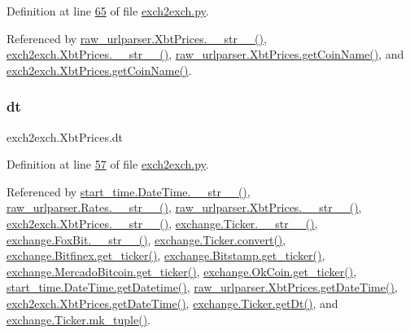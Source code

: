 Definition at line \hyperlink{exch2exch_8py_source_l00065}{65} of file \hyperlink{exch2exch_8py_source}{exch2exch.\+py}.



Referenced by \hyperlink{raw__urlparser_8py_source_l00074}{raw\+\_\+urlparser.\+Xbt\+Prices.\+\_\+\+\_\+str\+\_\+\+\_\+()}, \hyperlink{exch2exch_8py_source_l00091}{exch2exch.\+Xbt\+Prices.\+\_\+\+\_\+str\+\_\+\+\_\+()}, \hyperlink{raw__urlparser_8py_source_l00071}{raw\+\_\+urlparser.\+Xbt\+Prices.\+get\+Coin\+Name()}, and \hyperlink{exch2exch_8py_source_l00088}{exch2exch.\+Xbt\+Prices.\+get\+Coin\+Name()}.

\mbox{\label{classexch2exch_1_1_xbt_prices_af9f916c683c48631c97f1c5d91447751}} 
\subsubsection{\texorpdfstring{dt}{dt}}
{\footnotesize\ttfamily exch2exch.\+Xbt\+Prices.\+dt}



Definition at line \hyperlink{exch2exch_8py_source_l00057}{57} of file \hyperlink{exch2exch_8py_source}{exch2exch.\+py}.



Referenced by \hyperlink{start__time_2____init_____8py_source_l00034}{start\+\_\+time.\+Date\+Time.\+\_\+\+\_\+str\+\_\+\+\_\+()}, \hyperlink{raw__urlparser_8py_source_l00038}{raw\+\_\+urlparser.\+Rates.\+\_\+\+\_\+str\+\_\+\+\_\+()}, \hyperlink{raw__urlparser_8py_source_l00074}{raw\+\_\+urlparser.\+Xbt\+Prices.\+\_\+\+\_\+str\+\_\+\+\_\+()}, \hyperlink{exch2exch_8py_source_l00091}{exch2exch.\+Xbt\+Prices.\+\_\+\+\_\+str\+\_\+\+\_\+()}, \hyperlink{exchange_8py_source_l00136}{exchange.\+Ticker.\+\_\+\+\_\+str\+\_\+\+\_\+()}, \hyperlink{exchange_8py_source_l00610}{exchange.\+Fox\+Bit.\+\_\+\+\_\+str\+\_\+\+\_\+()}, \hyperlink{exchange_8py_source_l00069}{exchange.\+Ticker.\+convert()}, \hyperlink{exchange_8py_source_l00439}{exchange.\+Bitfinex.\+get\+\_\+ticker()}, \hyperlink{exchange_8py_source_l00511}{exchange.\+Bitstamp.\+get\+\_\+ticker()}, \hyperlink{exchange_8py_source_l00651}{exchange.\+Mercado\+Bitcoin.\+get\+\_\+ticker()}, \hyperlink{exchange_8py_source_l00716}{exchange.\+Ok\+Coin.\+get\+\_\+ticker()}, \hyperlink{start__time_2____init_____8py_source_l00031}{start\+\_\+time.\+Date\+Time.\+get\+Datetime()}, \hyperlink{raw__urlparser_8py_source_l00059}{raw\+\_\+urlparser.\+Xbt\+Prices.\+get\+Date\+Time()}, \hyperlink{exch2exch_8py_source_l00067}{exch2exch.\+Xbt\+Prices.\+get\+Date\+Time()}, \hyperlink{exchange_8py_source_l00097}{exchange.\+Ticker.\+get\+Dt()}, and \hyperlink{exchange_8py_source_l00121}{exchange.\+Ticker.\+mk\+\_\+tuple()}.

